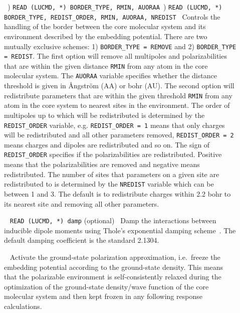 \begin{description}
\item[]\verb| |) \verb|READ (LUCMD, *) BORDER_TYPE, RMIN, AUORAA|\verb| |) \verb|READ (LUCMD, *) BORDER_TYPE, REDIST_ORDER, RMIN, AUORAA, NREDIST|\verb| |\newline
Controls the handling of the border between the core molecular system and its environment described by the embedding potential. There are two mutually exclusive schemes: 1) \verb|BORDER_TYPE = REMOVE| and 2) \verb|BORDER_TYPE = REDIST|. The first option will remove all multipoles and polarizabilities that are within the given distance \verb|RMIN| from any atom in the core molecular system. The \verb|AUORAA| variable specifies whether the distance threshold is given in \AA{}ngstr\"{o}m (AA) or bohr (AU). The second option will redistribute parameters that are within the given threshold \verb|RMIN| from any atom in the core system to nearest sites in the environment. The order of multipoles up to which will be redistributed is determined by the \verb|REDIST_ORDER| variable, e.g. \verb|REDIST_ORDER = 1| means that only charges will be redistributed and all other parameters removed, \verb|REDIST_ORDER = 2| means charges and dipoles are redistributed and so on. The sign of \verb|REDIST_ORDER| specifies if the polarizabilities are redistributed. Positive means that the polarizabilities are removed and negative means redistributed. The number of sites that parameters on a given site are redistributed to is determined by the \verb|NREDIST| variable which can be between 1 and 3. The default is to redistribute charges within 2.2 bohr to its nearest site and removing all other parameters.

\item[]\verb| |\newline
\verb|READ (LUCMD, *) damp| (optional)\verb| |\newline
Damp the interactions between inducible dipole moments using Thole's exponential damping scheme~\cite{thole_damp_1,thole_damp_2}. The default damping coefficient is the standard 2.1304.

\item[]\verb| |\newline
Activate the ground-state polarization approximation, i.e.\ freeze the embedding potential according to the ground-state density. This means that the polarizable environment is self-consistently relaxed during the optimization of the ground-state density/wave function of the core molecular system and then kept frozen in any following response calculations.


\end{description}
